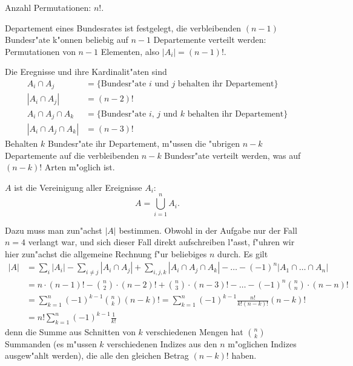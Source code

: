 \begin{loesung}
\begin{teilaufgaben}
\item Anzahl Permutationen: $n!$.
\item Departement eines Bundesrates ist festgelegt, die verbleibenden
$(n-1)$ Bundesr"ate k"onnen beliebig auf $n-1$ Departemente verteilt
werden: Permutationen von $n-1$ Elementen, also $|A_i|=(n-1)!$.
\item Die Eregnisse und ihre Kardinalit"aten sind
\begin{align*}
A_i\cap A_j&=\{\text{Bundesr"ate $i$ und $j$ behalten ihr Departement}\}
\\
|A_i\cap A_j|&=(n-2)!
\\
A_i\cap A_j\cap A_k&=\{\text{Bundesr"ate $i$, $j$ und $k$ behalten ihr Departement}\}
\\
|A_i\cap A_j\cap A_k|&=(n-3)!
\end{align*}
Behalten $k$ Bundesr"ate ihr Departement, m"ussen die "ubrigen
$n-k$ Departemente auf  die verbleibenden $n-k$ Bundesr"ate verteilt
werden, was auf $(n-k)!$ Arten m"oglich ist.
\item
\item $A$ ist die Vereinigung aller Ereignisse $A_i$:
\[
A=\bigcup_{i=1}^nA_i.
\]
\item
Dazu muss man zun"achst $|A|$ bestimmen.
Obwohl in der Aufgabe nur der Fall $n=4$ verlangt war, und sich dieser
Fall direkt aufschreiben l"asst, f"uhren wir hier zun"achst die allgemeine
Rechnung f"ur beliebiges $n$ durch.
Es gilt
\begin{align*}
|A|&=\sum_{i}|A_i| - \sum_{i\ne j}|A_i\cap A_j| + \sum_{i,j,k}|A_i\cap A_j\cap A_k|-\dots-(-1)^n|A_1\cap\dots\cap A_n|
\\
&=
n\cdot (n-1)!
-\binom{n}{2}\cdot (n-2)!
+\binom{n}{3}\cdot (n-3)!
-\dots
-(-1)^n
\binom{n}{n}\cdot (n-n)!
\\
&=\sum_{k=1}^n(-1)^{k-1}\binom{n}{k}(n-k)!
=\sum_{k=1}^n(-1)^{k-1}\frac{n!}{k!(n-k)!}(n-k)!
\\
&=n!\sum_{k=1}^n(-1)^{k-1}\frac{1}{k!}
\end{align*}
denn die Summe aus Schnitten von $k$ verschiedenen Mengen hat
$\binom{n}{k}$ Summanden (es m"ussen $k$ verschiedenen Indizes
aus den $n$ m"oglichen Indizes ausgew"ahlt werden), die alle
den gleichen Betrag $(n-k)!$ haben.


\end{teilaufgaben}
\end{loesung}
